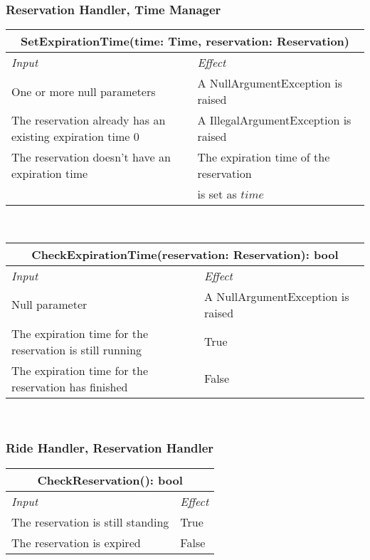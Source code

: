 		
		
		\subsubsection*{Reservation Handler, Time Manager}
			\begin{tabular}{ |l|l| }
				\hline
				\multicolumn{2}{|c|}{SetExpirationTime(time: Time, reservation: Reservation)}\\
				\hline
				\textit{Input} & \textit{Effect}\\ \hline
				One or more null parameters & A NullArgumentException is raised\\ \hline
				The reservation already has an existing expiration time 0& A IllegalArgumentException is raised \\ \hline %
				The reservation doesn't have an expiration time & The expiration time of the reservation\\ & is set as $time$\\ \hline
			\end{tabular}
			\\
			\begin{tabular}{ |l|l| }
				\hline
				\multicolumn{2}{|c|}{CheckExpirationTime(reservation: Reservation): bool}\\
				\hline
				\textit{Input} & \textit{Effect}\\ \hline
				Null parameter & A NullArgumentException is raised\\ \hline
				The expiration time for the reservation is still running & True\\ \hline
				The expiration time for the reservation has finished & False\\ \hline
			\end{tabular}
			\\
		
		
		
		\subsubsection*{Ride Handler, Reservation Handler}
			\begin{tabular}{ |l|l| }
				\hline
				\multicolumn{2}{|c|}{CheckReservation(): bool}\\
				\hline
				\textit{Input} & \textit{Effect}\\ \hline
				The reservation is still standing & True\\ \hline
				The reservation is expired & False\\ \hline
			\end{tabular}
			\\
		
